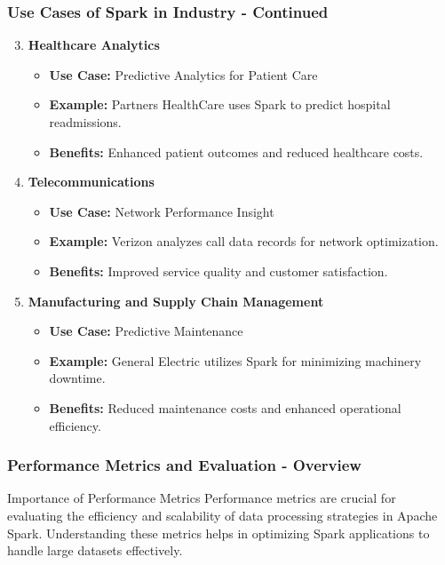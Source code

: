 \documentclass[aspectratio=169]{beamer}
\begin{document}
\begin{frame}[fragile]
    \frametitle{Use Cases of Spark in Industry - Continued}
    \begin{enumerate}
        \setcounter{enumi}{2}  %
        \item \textbf{Healthcare Analytics}
            \begin{itemize}
                \item \textbf{Use Case:} Predictive Analytics for Patient Care
                \item \textbf{Example:} Partners HealthCare uses Spark to predict hospital readmissions.
                \item \textbf{Benefits:} Enhanced patient outcomes and reduced healthcare costs.
            \end{itemize}

        \item \textbf{Telecommunications}
            \begin{itemize}
                \item \textbf{Use Case:} Network Performance Insight
                \item \textbf{Example:} Verizon analyzes call data records for network optimization.
                \item \textbf{Benefits:} Improved service quality and customer satisfaction.
            \end{itemize}

        \item \textbf{Manufacturing and Supply Chain Management}
            \begin{itemize}
                \item \textbf{Use Case:} Predictive Maintenance
                \item \textbf{Example:} General Electric utilizes Spark for minimizing machinery downtime.
                \item \textbf{Benefits:} Reduced maintenance costs and enhanced operational efficiency.
            \end{itemize}
    \end{enumerate}
\end{frame}

\begin{frame}[fragile]
  \frametitle{Performance Metrics and Evaluation - Overview}
  \begin{block}{Importance of Performance Metrics}
    Performance metrics are crucial for evaluating the efficiency and scalability of data processing strategies in Apache Spark. Understanding these metrics helps in optimizing Spark applications to handle large datasets effectively.
  \end{block}
\end{frame}
\end{document}
